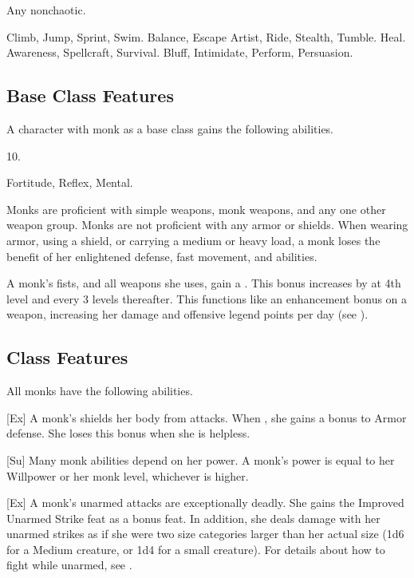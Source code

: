  Any nonchaotic.

 Climb, Jump, Sprint, Swim.
 Balance, Escape Artist, Ride, Stealth, Tumble.
 Heal.
 Awareness, Spellcraft, Survival.
 Bluff, Intimidate, Perform, Persuasion.

\subsection{Base Class Features}
A character with monk as a base class gains the following abilities.

 10.

  Fortitude,  Reflex,  Mental.

Monks are proficient with simple weapons, monk weapons, and any one other weapon group.
Monks are not proficient with any armor or shields.
When wearing armor, using a shield, or carrying a medium or heavy load, a monk loses the benefit of her enlightened defense, fast movement, and \ki abilities.

 A monk's fists, and all weapons she uses, gain a  .
This bonus increases by  at 4th level and every 3 levels thereafter.
This functions like an enhancement bonus on a weapon, increasing her damage and offensive legend points per day (see ).

\subsection{Class Features}
All monks have the following abilities.

[Ex]
A monk's \ki shields her body from attacks.
When \monkunencumbered, she gains a  bonus to Armor defense.
She loses this bonus when she is helpless.

[Su]
Many monk abilities depend on her \ki power.
A monk's \ki power is equal to her Willpower or her monk level, whichever is higher.

[Ex]
A monk's unarmed attacks are exceptionally deadly.
She gains the Improved Unarmed Strike feat as a bonus feat.
In addition, she deals damage with her unarmed strikes as if she were two size categories larger than her actual size (1d6 for a Medium creature, or 1d4 for a small creature).
For details about how to fight while unarmed, see .

